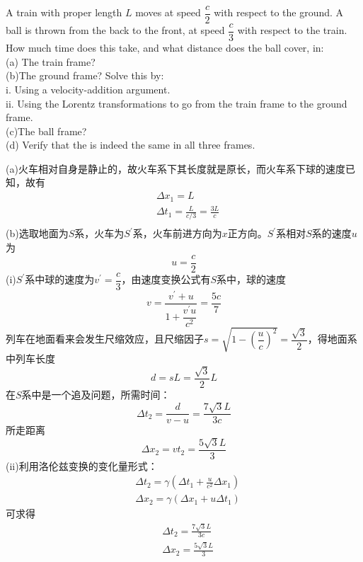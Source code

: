 \begin{solution}

    A train with proper length $L$ moves at speed $\dfrac{c}{2}$ with respect to the ground. A ball is thrown from the back to the front, at speed $\dfrac{c}{3}$ with respect to the train. How much time does this take, and what distance does the ball cover, in:
    \\(a) The train frame?
    \\(b)The ground frame? Solve this by:
    \\\hspace*{2em}i. Using a velocity-addition argument.
    \\\hspace*{2em}ii. Using the Lorentz transformations to go from the train
    frame to the ground frame.
    \\(c)The ball frame?
    \\(d) Verify that the  is indeed the same in all three
    frames.

    \tcbrule

    (a)火车相对自身是静止的，故火车系下其长度就是原长，而火车系下球的速度已知，故有
    \begin{equation*}
        \begin{aligned}
             & \Delta x_{1}=L                          \\
             & \Delta t_{1}=\frac{L}{c/3}=\frac{3L}{c} \\
        \end{aligned}
    \end{equation*}
    (b)选取地面为$S$系，火车为$S^{\prime}$系，火车前进方向为$x$正方向。$S^{\prime}$系相对$S$系的速度$u$为
    \[u=\dfrac{c}{2}\]
    (i)$S^{\prime}$系中球的速度为$v^{\prime}=\dfrac{c}{3}$，由速度变换公式有$S$系中，球的速度
    \[v=\dfrac{v^{\prime}+u}{1+\dfrac{{v}^{\prime}u}{c^2}}=\frac{5c}{7}\]
    列车在地面看来会发生尺缩效应，且尺缩因子$s = \sqrt{1-\left(\dfrac{u}{c}\right)^{2}} = \dfrac{\sqrt{3}}{2}$，得地面系中列车长度
    \[ d=sL = \dfrac{\sqrt{3}}{2}L\]
    在$S$系中是一个追及问题，所需时间：
    \[\Delta t_2=\frac{d}{v-u}=\frac{7\sqrt{3}L}{3c}\]
    所走距离
    \[\Delta x_2=vt_{2}=\frac{5\sqrt{3}L}{3}\]
    (ii)利用洛伦兹变换的变化量形式：
    \begin{equation*}
        \begin{aligned}
             & \Delta t_2 = \gamma(\Delta t_1 + \frac{u} {c^{2}}\Delta x_1) \\
             & \Delta x_2 = \gamma(\Delta x_1 + u\Delta t_1)
        \end{aligned}
    \end{equation*}
    可求得
    \begin{equation*}
        \begin{aligned}
             & \Delta t_2=\frac{7\sqrt{3}L}{3c} \\[1ex]
             & \Delta x_2=\frac{5\sqrt{3}L}{3}  \\
        \end{aligned}
    \end{equation*}


\end{solution}
